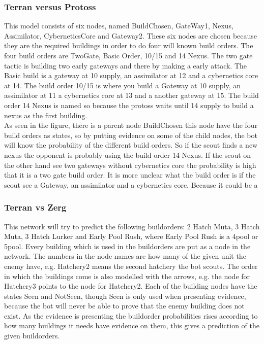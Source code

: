 \subsubsection{Terran versus Protoss}
This model consists of six nodes, named BuildChosen, GateWay1, Nexus, Assimilator, CyberneticsCore and Gateway2. These six nodes are chosen  because they are the required buildings in order to do four will known build orders. The four build orders are TwoGate, Basic Order, 10/15 and 14 Nexus.
The two gate tactic is building two early gateways and there by making a early attack. The Basic build is a gateway at 10 supply, an assimilator at 12 and a cybernetics core at 14. The build order 10/15 is where you build a Gateway at 10 supply, an assimilator at 11 a cybernetics core at 13  and a 
another gateway at 15. The build order 14 Nexus is named so because the protoss waits until 14 supply to build a nexus as the first building. \\
As seen in the figure, there is a parent node BuildChosen this node have the four build orders as states, so by putting evidence on some of the child nodes, the bot will know the probability of the different build orders. So if the scout finds a new nexus the opponent is probably using the build order
14 Nexus. If the scout on the other hand see two gateways without cybernetics core the probability is high that it is a two gate build order. It is more unclear what the build order is if the scout see a Gateway, an assimilator and a cybernetics core. Because it could be a  


\subsubsection{Terran vs Zerg}
	This network will try to predict the following buildorders: 2 Hatch Muta, 3 Hatch Muta, 3 Hatch Lurker and Early Pool Rush, 
	where Early Pool Rush is a 4pool or 5pool. Every building which is used in the buildorders are put as a node in the network. 
	The numbers in the node names are how many of the given unit the enemy have, e.g. Hatchery2 means the second hatchery the bot scouts. 
	The order in which the buildings come is also modelled with the arrows, 
	e.g. the node for Hatchery3 points to the node for Hatchery2. Each of the building nodes have the states Seen and NotSeen, 
	though Seen is only used when presenting evidence, because the bot will never be able to prove that the 
	enemy building does not exist. As the evidence is presenting the buildorder 
	probabilities rises according to how many buildings it needs have evidence on them, this gives a prediction of the given buildorders.

